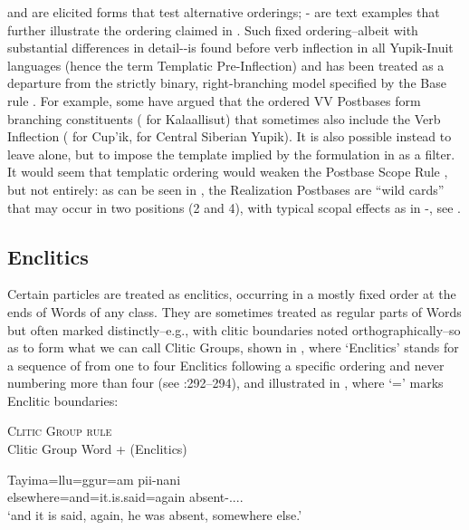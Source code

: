 \documentclass[output=paper]{langscibook}
\begin{document}
 and  are elicited forms that test alternative orderings; - are text examples that further illustrate the ordering claimed in . Such fixed ordering--albeit with substantial differences in detail-{}-is found before verb inflection in all Yupik-Inuit languages (hence the term Templatic Pre-Inflection) and has been treated as a departure from the strictly binary, right-branching model specified by the Base rule . For example, some have argued that the ordered VV Postbases form branching constituents (\citealt{Fortescue1980} for Kalaallisut) that sometimes also include the Verb Inflection (\citealt{Woodbury1981} for Cup'ik, \citealt{Reuse1994} for Central Siberian Yupik). It is also possible instead to leave  alone, but to impose the template implied by the formulation in  as a filter. It would seem that templatic ordering would weaken the Postbase Scope Rule , but not entirely: as can be seen in , the Realization Postbases are ``wild cards'' that may occur in two positions (2 and 4), with typical scopal effects as in -, see \citet[554--555]{Woodbury2017}.

\subsection{Enclitics} \label{sec:3.3}

Certain particles are treated as enclitics, occurring in a mostly fixed order at the ends of Words of any class. They are sometimes treated as regular parts of Words but often marked distinctly--e.g., with clitic boundaries noted orthographically--so as to form what we can call Clitic Groups, shown in , where `Enclitics' stands for a sequence of from one to four Enclitics following a specific ordering and never numbering more than four (see \citealt{Woodbury1981}:292--294), and illustrated in , where `=' marks Enclitic boundaries:

\ea\label{ex:key:18}
{\textsc{Clitic} \textsc{Group} \textsc{rule}}\\
Clitic Group \MVRightarrow Word + (Enclitics)
\z

\ea\label{ex:key:19}
\gll Tayima=llu=ggur=am pii-nani\\
     elsewhere=and=it.is.said=again absent-\Appos.\Third.\Refl.\Sg.\Sarg{}\\
\glt `and it is said, again, he was absent, somewhere else.'
\z
\end{document}
